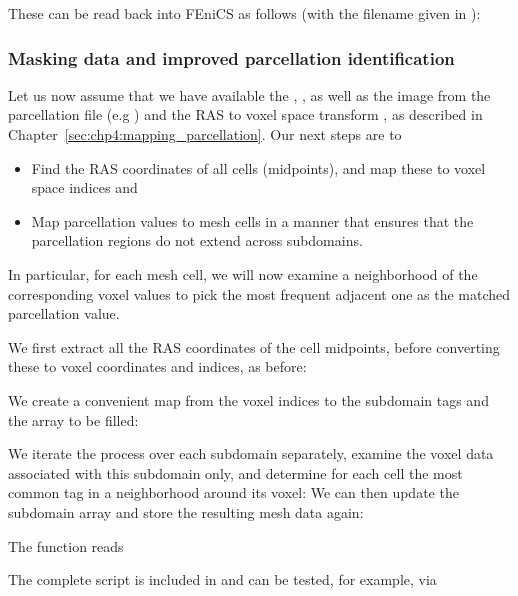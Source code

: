 These can be read back into FEniCS as follows (with the filename given in ):

\subsubsection*{Masking data and improved parcellation identification}

Let us now assume that we have available the ,
, as well as the image  from the
parcellation file (e.g ) and the RAS to voxel space
transform , as described in
Chapter~\ref{sec:chp4:mapping_parcellation}. Our next steps are to
\begin{itemize}
\item
  Find the RAS coordinates of all cells (midpoints), and map these to
  voxel space indices and
\item
  Map parcellation values to mesh cells in a manner that ensures that the
  parcellation regions do not extend across subdomains.
\end{itemize}
In particular, for each mesh cell, we will now examine a neighborhood of the
corresponding voxel values to pick the most frequent adjacent one as
the matched parcellation value. 

We first extract all the RAS coordinates of the cell midpoints,
before converting these to voxel coordinates and indices, as before:

We create a convenient map from the voxel indices to the subdomain tags and
the  array to be filled:

We iterate the process over each subdomain separately, examine the voxel data
associated with this subdomain only, and determine for each cell the most
common tag in a neighborhood around its voxel:
We can then update the subdomain array
and store the resulting mesh data again:

The  function reads 

The complete script is included in
 and can be tested, for example, via 

